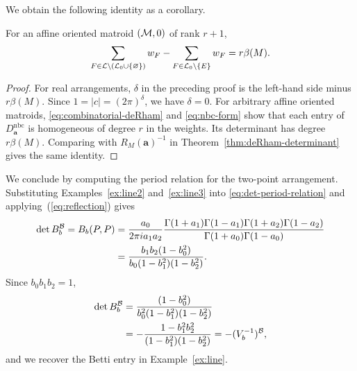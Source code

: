 We obtain the following identity as a corollary.
\begin{corollary}\label{cor:degree}
For an affine oriented matroid $(\mathcal M,0)$ of rank $r+1$,
\[
 \sum_{F\in\mathcal L\setminus(\mathcal L_0\cup\{\varnothing\})}w_F
 -\sum_{F\in\mathcal L_0\setminus\{E\}}w_F=r\beta(M).
\]
\end{corollary}
\begin{proof}
For real arrangements, $\delta$ in the preceding proof is the
left-hand side minus $r\beta(M)$. Since $1=|c|=(2\pi)^\delta$,
we have $\delta=0$.
For arbitrary affine oriented matroids,
\eqref{eq:combinatorial-deRham} and \eqref{eq:nbc-form} show that
each entry of $D_{\mathbf a}^{\mathrm{nbc}}$ is homogeneous of degree
$r$ in the weights. Its determinant has degree $r\beta(M)$. Comparing with
$R_M(\mathbf a)^{-1}$ in Theorem~\ref{thm:deRham-determinant}
gives the same identity.
\end{proof}

\begin{example}\label{ex:line4}
We conclude by computing the period relation for the two-point
arrangement. Substituting Examples~\ref{ex:line2} and~\ref{ex:line3}
into \eqref{eq:det-period-relation} and applying~(\ref{eq:reflection}) gives
\[
 \begin{aligned}
 \det B_b^{\mathcal B} = B_b(P,P)
 &=\frac{a_0}{2\pi i a_1a_2}
   \frac{\Gamma(1+a_1)\Gamma(1-a_1)
         \Gamma(1+a_2)\Gamma(1-a_2)}
        {\Gamma(1+a_0)\Gamma(1-a_0)}\\
 &=\frac{b_1 b_2(1-b_0^2)}{b_0 (1-b_1^2)(1-b_2^2)}.
 \end{aligned}
\]
Since $b_0b_1b_2=1$,
\[
 \begin{aligned}
 \det B_b^{\mathcal B}
 &=\frac{(1-b_0^2)}{b_0^2 (1-b_1^2)(1-b_2^2)}\\
 &=-\frac{1-b_1^2b_2^2}{(1-b_1^2)(1-b_2^2)}
 =-(V_b^{-1})^{\mathcal B},
 \end{aligned}
\]
and we recover the Betti entry in Example~\ref{ex:line}.
\end{example}
